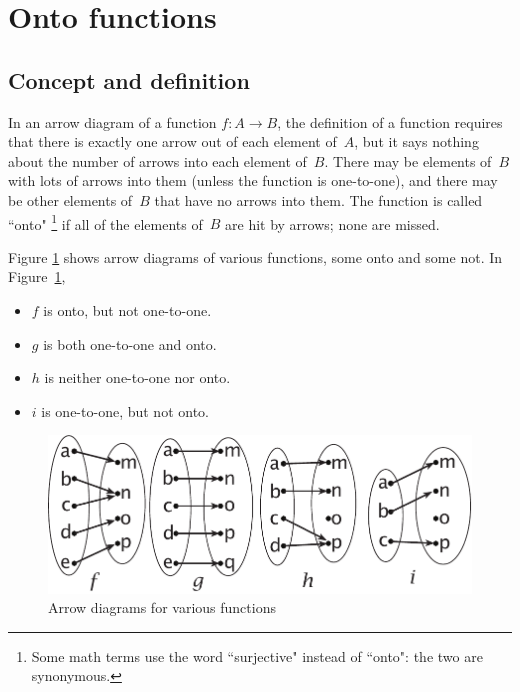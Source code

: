\section{Onto functions}

\subsection{Concept and definition}
In an arrow diagram of a function $f \colon A \to B$, the definition of a function requires that there is exactly one arrow out of each element of~$A$,  but it says nothing about the number of arrows into each element of~$B$. There may be elements of~$B$ with lots of arrows into them (unless the function is one-to-one), and there may be other elements of~$B$ that have no arrows into them. 
The function is called ``onto"
\footnote{Some math terms use the word ``surjective" instead of ``onto": the two are synonymous.}
 if all of the elements of~$B$ are hit by arrows; none are missed.

\begin{example}{}
Figure \ref{arrowontofig} shows arrow diagrams of various functions, some onto and some not.
In Figure~\ref{arrowontofig},
\begin{itemize}
\item
$f$ is onto, but not one-to-one. 
\item
$g$ is both one-to-one and onto. 
\item
$h$ is neither one-to-one nor onto. 
\item
$i$ is one-to-one, but not onto.
\end{itemize}
\end{example}

\begin{center}
\begin{figure}[h]
\includegraphics[scale=0.6]{images/arrowonto.pdf}
\caption{Arrow diagrams for various functions}
\label{arrowontofig}
\end{figure}
\end{center}


